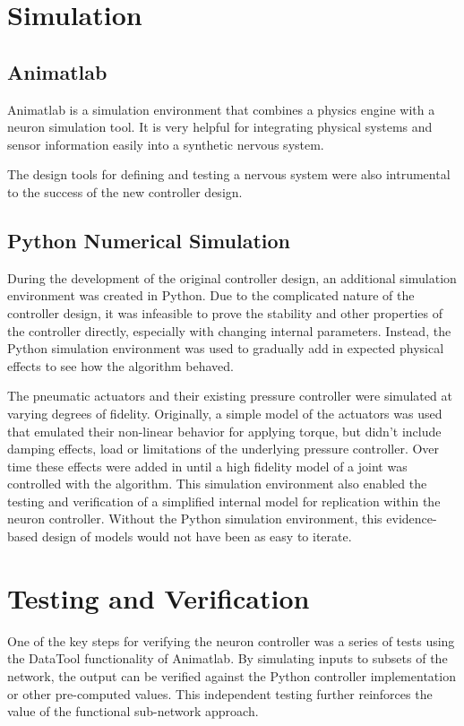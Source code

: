 \section{Simulation}

\subsection{Animatlab}

Animatlab is a simulation environment that combines a physics engine with a
neuron simulation tool. It is very helpful for integrating physical systems
and sensor information easily into a synthetic nervous system.

The design tools for defining and testing a nervous system were also intrumental
to the success of the new controller design.

\subsection{Python Numerical Simulation}

During the development of the original controller design, an additional
simulation environment was created in Python. Due to the complicated nature of
the controller design, it was infeasible to prove the stability and other
properties of the controller directly, especially with changing internal
parameters. Instead, the Python simulation environment was used to gradually add
in expected physical effects to see how the algorithm behaved.

The pneumatic actuators and their existing pressure controller were simulated 
at varying degrees of fidelity. Originally, a simple model of the actuators
was used that emulated their non-linear behavior for applying torque, but didn't
include damping effects, load or limitations of the underlying pressure
controller. Over time these effects were added in until a high fidelity model of
a joint was controlled with the algorithm. This simulation environment also
enabled the testing and verification of a simplified internal model for
replication within the neuron controller. Without the Python simulation
environment, this evidence-based design of models would not have been as easy to
iterate.

\section{Testing and Verification}

One of the key steps for verifying the neuron controller was a series of tests
using the DataTool functionality of Animatlab. By simulating inputs to subsets
of the network, the output can be verified against the Python controller
implementation or other pre-computed values. This independent testing further
reinforces the value of the functional sub-network approach.

